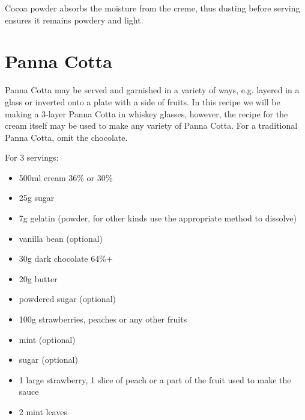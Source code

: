 Cocoa powder absorbs the moisture from the creme, thus dusting before serving
ensures it remains powdery and light.

\section{Panna Cotta}
Panna Cotta may be served and garnished in a variety of ways, e.g. layered in a
glass or inverted onto a plate with a side of fruits. In this recipe we will be
making a 3-layer Panna Cotta in whiskey glasses, however, the recipe for the
cream itself may be used to make any variety of Panna Cotta. For a traditional
Panna Cotta, omit the chocolate.

For 3 servings:

\begin{itemize}
  \item 500ml cream 36\% or 30\%
  \item 25g sugar
  \item 7g gelatin (powder, for other kinds use the appropriate method to
  dissolve)
  \item vanilla bean (optional)
\end{itemize}

\begin{itemize}
  \item 30g dark chocolate 64\%+
  \item 20g butter
  \item powdered sugar (optional)
\end{itemize}

\begin{itemize}
  \item 100g strawberries, peaches or any other fruits
  \item mint (optional)
  \item sugar (optional)
\end{itemize}

\begin{itemize}
  \item 1 large strawberry, 1 slice of peach or a part of the fruit used to
  make the sauce
  \item 2 mint leaves
\end{itemize}

